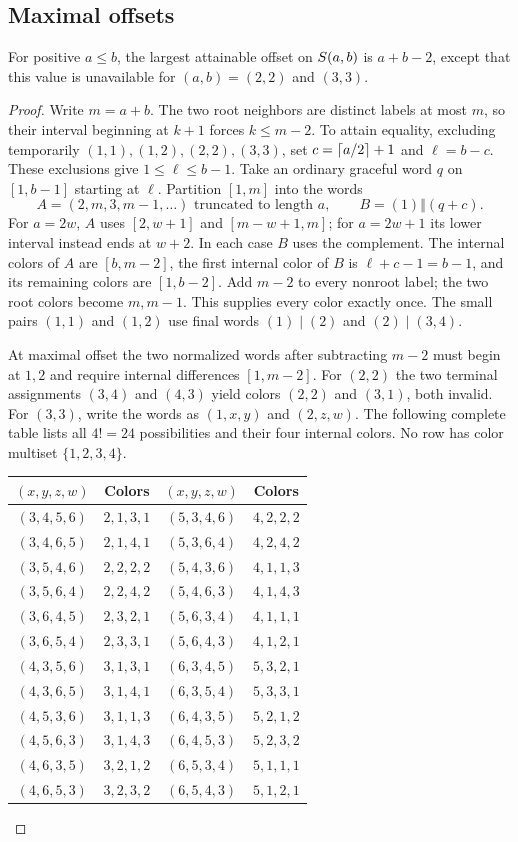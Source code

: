 \subsection{Maximal offsets}\label{po:maximal}
\begin{theorem}
For positive $a\le b$, the largest attainable offset on $S\!\left(a,b\right)$ is $a+b-2$, except that this value is unavailable for $(a,b)=(2,2)$ and $(3,3)$.
\end{theorem}
\begin{proof}
Write $m=a+b$. The two root neighbors are distinct labels at most $m$, so their interval beginning at $k+1$ forces $k\le m-2$. To attain equality, excluding temporarily $(1,1),(1,2),(2,2),(3,3)$, set $c=\left\lceil a/2\right\rceil+1$ and $\ell=b-c$. These exclusions give $1\le\ell\le b-1$. Take an ordinary graceful word $q$ on $[1,b-1]$ starting at $\ell$. Partition $[1,m]$ into the words
\[
A=(2,m,3,m-1,\ldots)\text{ truncated to length }a,
\qquad B=(1)\Vert(q+c).
\]
For $a=2w$, $A$ uses $[2,w+1]$ and $[m-w+1,m]$; for $a=2w+1$ its lower interval instead ends at $w+2$. In each case $B$ uses the complement. The internal colors of $A$ are $[b,m-2]$, the first internal color of $B$ is $\ell+c-1=b-1$, and its remaining colors are $[1,b-2]$. Add $m-2$ to every nonroot label; the two root colors become $m,m-1$. This supplies every color exactly once. The small pairs $(1,1)$ and $(1,2)$ use final words $(1)\mid(2)$ and $(2)\mid(3,4)$.

At maximal offset the two normalized words after subtracting $m-2$ must begin at $1,2$ and require internal differences $[1,m-2]$. For $(2,2)$ the two terminal assignments $(3,4)$ and $(4,3)$ yield colors $(2,2)$ and $(3,1)$, both invalid. For $(3,3)$, write the words as $(1,x,y)$ and $(2,z,w)$. The following complete table lists all $4!=24$ possibilities and their four internal colors. No row has color multiset $\{1,2,3,4\}$.
\begin{center}\small\begin{tabular}{cc|cc}
$(x,y,z,w)$ & Colors & $(x,y,z,w)$ & Colors\\\hline
$(3,4,5,6)$ & $2,1,3,1$ & $(5,3,4,6)$ & $4,2,2,2$\\
$(3,4,6,5)$ & $2,1,4,1$ & $(5,3,6,4)$ & $4,2,4,2$\\
$(3,5,4,6)$ & $2,2,2,2$ & $(5,4,3,6)$ & $4,1,1,3$\\
$(3,5,6,4)$ & $2,2,4,2$ & $(5,4,6,3)$ & $4,1,4,3$\\
$(3,6,4,5)$ & $2,3,2,1$ & $(5,6,3,4)$ & $4,1,1,1$\\
$(3,6,5,4)$ & $2,3,3,1$ & $(5,6,4,3)$ & $4,1,2,1$\\
$(4,3,5,6)$ & $3,1,3,1$ & $(6,3,4,5)$ & $5,3,2,1$\\
$(4,3,6,5)$ & $3,1,4,1$ & $(6,3,5,4)$ & $5,3,3,1$\\
$(4,5,3,6)$ & $3,1,1,3$ & $(6,4,3,5)$ & $5,2,1,2$\\
$(4,5,6,3)$ & $3,1,4,3$ & $(6,4,5,3)$ & $5,2,3,2$\\
$(4,6,3,5)$ & $3,2,1,2$ & $(6,5,3,4)$ & $5,1,1,1$\\
$(4,6,5,3)$ & $3,2,3,2$ & $(6,5,4,3)$ & $5,1,2,1$\\
\end{tabular}\end{center}


\end{proof}
